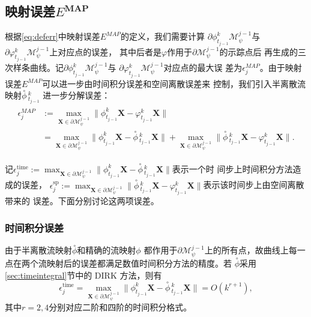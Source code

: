 \documentclass[a4paper,twoside]{ctexart}
\begin{document}
\subsection{映射误差$E^{\textbf{MAP}}$}
\label{sec:MAP}
根据\eqref{eq:deferr}中映射误差$E^{MAP}$的定义，我们需要计算
$\partial\phi_{t_{j-1}}^{k}\mathcal{M}_{\psi}^{j-1}$与
$\partial\varphi_{t_{j-1}}^{k}\mathcal{M}_{\psi}^{j-1}$上对应点的误差，
其中后者是$\varphi$作用于$\partial\mathcal{M}_{\psi}^{j-1}$的示踪点后
再生成的三次样条曲线。记$\partial\phi_{t_{j-1}}^{k}\mathcal{M}_{\psi}^{j-1}$与
$\partial\varphi_{t_{j-1}}^{k}\mathcal{M}_{\psi}^{j-1}$对应点的最大误
差为$\epsilon_j^{MAP}$。由于映射误差$E^{MAP}$可以进一步由时间积分误差和空间离散误差来
控制，我们引入半离散流映射${\overset{\circ}{\phi}}\, \! _{t_{j-1}}^k$
进一步分解误差：
\begin{eqnarray}
  \label{eq:deMAP}
  \begin{aligned}
    \epsilon_j^{MAP} &:=
    \max_{\boldsymbol X\in\partial\mathcal{M}_{\psi}^{j-1}}\|\phi_{t_{j-1}}^{k}\boldsymbol X
    - \varphi_{t_{j-1}}^{k}\boldsymbol X\|\\
    &=\max_{\boldsymbol X\in\partial\mathcal{M}_{\psi}^{j-1}}\|\phi_{t_{j-1}}^{k}\boldsymbol X
    - {\overset{\circ}{\phi}}\, \! _{t_{j-1}}^k\boldsymbol X\| + \max_{\boldsymbol X\in\partial\mathcal{M}_{\psi}^{j-1}}\|{\overset{\circ}{\phi}}\, \! _{t_{j-1}}^k\boldsymbol X
    - \varphi_{t_{j-1}}^{k}\boldsymbol X\|.
  \end{aligned}
\end{eqnarray}

记$\epsilon_j^{\text{time}}:=\max_{\boldsymbol X\in\partial\mathcal{M}_{\psi}^{j-1}}\|\phi_{t_{j-1}}^{k}\boldsymbol X
    - {\overset{\circ}{\phi}}\, \! _{t_{j-1}}^k\boldsymbol X\|$表示一个时
    间步上时间积分方法造成的误差，
    $\epsilon_j^{\text{sp}}:=\max_{\boldsymbol X\in\partial\mathcal{M}_{\psi}^{j-1}}\|{\overset{\circ}{\phi}}\, \! _{t_{j-1}}^k\boldsymbol X
    - \varphi_{t_{j-1}}^{k}\boldsymbol X\|$表示该时间步上由空间离散带来的
    误差。下面分别讨论这两项误差。
    \subsubsection{时间积分误差}
    \label{sec:timeigerr}
    由于半离散流映射$\overset{\circ}{\phi}$和精确的流映射$\phi$
    都作用于$\partial\mathcal{M}_{\psi}^{j-1}$上的所有点，故曲线上每一
    点在两个流映射后的误差都满足数值时间积分方法的精度。若
    $\overset{\circ}{\phi}$采用\ref{sec:timeintegral}节中的
    DIRK 方法，则有
    \begin{equation}
      \label{eq:timeigerr}
      \epsilon_j^{\text{time}}=\max_{\boldsymbol X\in\partial\mathcal{M}_{\psi}^{j-1}}\|\phi_{t_{j-1}}^{k}\boldsymbol X
    - {\overset{\circ}{\phi}}\, \! _{t_{j-1}}^k\boldsymbol X\| = O(k^{r+1}),
  \end{equation}
  其中$r = 2,4$分别对应二阶和四阶的时间积分格式。
\end{document}
